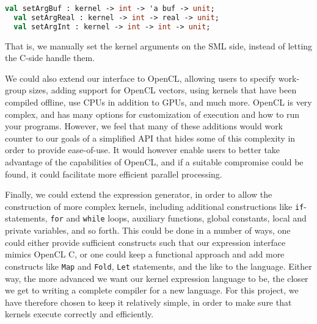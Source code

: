 \begin{lstlisting}[language=ML,mathescape]
  val setArgBuf : kernel -> int -> 'a buf -> unit;
  val setArgReal : kernel -> int -> real -> unit;
  val setArgInt : kernel -> int -> int -> unit;
\end{lstlisting}

That is, we manually set the kernel arguments on the SML side, instead
of letting the C-side handle them.

We could also extend our interface to OpenCL, allowing users to
specify work-group sizes, adding support for OpenCL vectors, using
kernels that have been compiled offline, use CPUs in addition to GPUs,
and much more. OpenCL is very complex, and has many options for
customization of execution and how to run your programs. However, we
feel that many of these additions would work counter to our goals of a
simplified API that hides some of this complexity in order to provide
ease-of-use. It would however enable users to better take advantage of
the capabilities of OpenCL, and if a suitable compromise could be
found, it could facilitate more efficient parallel processing.

Finally, we could extend the expression generator, in order to allow
the construction of more complex kernels, including additional
constructions like \texttt{if}-statements, \texttt{for} and
\texttt{while} loops, auxiliary functions, global constants, local and
private variables, and so forth. This could be done in a number of
ways, one could either provide sufficient constructs such that our
expression interface mimics OpenCL C, or one could keep a functional
approach and add more constructs like \texttt{Map} and \texttt{Fold},
\texttt{Let} statements, and the like to the language. Either way, the
more advanced we want our kernel expression language to be, the closer
we get to writing a complete compiler for a new language. For this
project, we have therefore chosen to keep it relatively simple, in
order to make sure that kernels execute correctly and efficiently.
